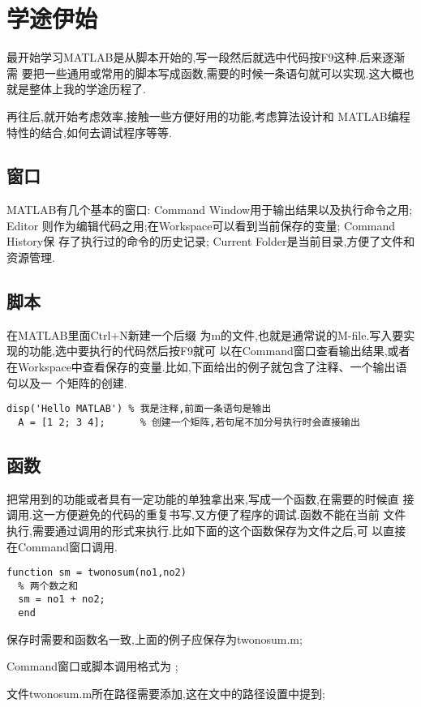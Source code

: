 ﻿\section{学途伊始}
最开始学习MATLAB是从脚本开始的,写一段然后就选中代码按F9这种.后来逐渐需
要把一些通用或常用的脚本写成函数,需要的时候一条语句就可以实现.这大概也
就是整体上我的学途历程了.\par
再往后,就开始考虑效率,接触一些方便好用的功能,考虑算法设计和
MATLAB编程特性的结合,如何去调试程序等等.

\subsection{窗口}
MATLAB有几个基本的窗口: Command Window用于输出结果以及执行命令之用; Editor
则作为编辑代码之用;在Workspace可以看到当前保存的变量; Command History保
存了执行过的命令的历史记录; Current Folder是当前目录,方便了文件和资源管理.

\subsection{脚本}
在MATLAB里面Ctrl+N新建一个后缀
为m的文件,也就是通常说的M-file.写入要实现的功能,选中要执行的代码然后按F9就可
以在Command窗口查看输出结果,或者在Workspace中查看保存的变量.比如,下面给出的例子就包含了注释、一个输出语句以及一
个矩阵的创建.

\vspace{-0.8cm}
\begin{lstlisting}[caption=第一个脚本]
  disp('Hello MATLAB') % 我是注释,前面一条语句是输出
  A = [1 2; 3 4];      % 创建一个矩阵,若句尾不加分号执行时会直接输出
\end{lstlisting}

\subsection{函数}
把常用到的功能或者具有一定功能的单独拿出来,写成一个函数,在需要的时候直
接调用.这一方便避免的代码的重复书写,又方便了程序的调试.函数不能在当前
文件执行,需要通过调用的形式来执行.比如下面的这个函数保存为文件之后,可
以直接在Command窗口调用.

\vspace{-0.8cm}
\begin{lstlisting}[caption = 第一个函数]
  function sm = twonosum(no1,no2)
  % 两个数之和
  sm = no1 + no2;
  end
\end{lstlisting}

\begindot
  \item 保存时需要和函数名一致,上面的例子应保存为twonosum.m;
  \item Command窗口或脚本调用格式为 ;
  \item 文件twonosum.m所在路径需要添加,这在文中的路径设置中提到;
\myenddot

